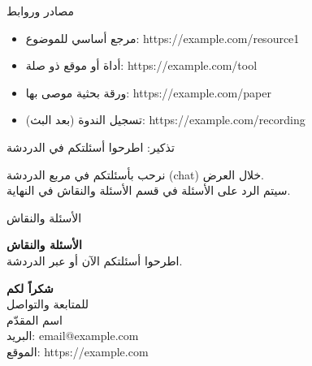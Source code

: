 \documentclass[aspectratio=169,11pt]{beamer}
\let\textEN\textenglish
\begin{document}
\begin{frame}{مصادر وروابط}
\begin{itemize}
  \item مرجع أساسي للموضوع: \textEN{https://example.com/resource1}
  \item أداة أو موقع ذو صلة: \textEN{https://example.com/tool}
  \item ورقة بحثية موصى بها: \textEN{https://example.com/paper}
  \item تسجيل الندوة (بعد البث): \textEN{https://example.com/recording}
\end{itemize}
\end{frame}

\begin{frame}{تذكير: اطرحوا أسئلتكم في الدردشة}
\begin{center}
\vspace{0.8cm}
{\Large نرحب بأسئلتكم في مربع الدردشة \textEN{(chat)} خلال العرض.}\\[0.8cm]
{\normalsize سيتم الرد على الأسئلة في قسم الأسئلة والنقاش في النهاية.}
\end{center}
\end{frame}

\begin{frame}{الأسئلة والنقاش}
\begin{center}
\vspace{1cm}
{\Huge\bfseries\color{accent} الأسئلة والنقاش}\\[0.8cm]
{\large اطرحوا أسئلتكم الآن أو عبر الدردشة.}
\end{center}
\end{frame}

\begin{frame}[plain]
\begin{center}
\vspace{1.2cm}
{\Huge\bfseries\color{accent} شكراً لكم}\\[1cm]
{\Large للمتابعة والتواصل}\\[0.8cm]
{\large اسم المقدّم}\\
{\normalsize البريد: \textEN{email@example.com}}\\
{\normalsize الموقع: \textEN{https://example.com}}
\end{center}
\end{frame}
\end{document}
